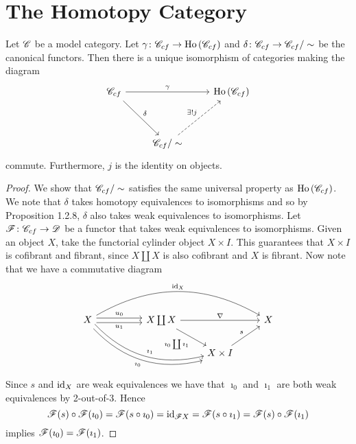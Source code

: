 \documentclass[10pt]{amsart}
\begin{document}
\section{The Homotopy Category}

\begin{cor}
  Let $\mathscr{C}$ be a model category.
  Let $\gamma \colon \mathscr{C}_{cf} \to \operatorname{Ho}\left(\mathscr{C}_{cf}\right)$ and $\delta \colon \mathscr{C}_{cf} \to \mathscr{C}_{cf}/\sim$ be the canonical functors.
  Then there is a unique isomorphism of categories making the diagram
  $$\begin{tikzcd}
    \C_{cf} \arrow{rdd}{\delta} \arrow{rr}{\gamma} & & \Ho{\C_{cf}}\\
      \\
      & \C_{cf}/\sim \arrow[dashed]{uur}{\exists ! j}
  \end{tikzcd}$$
  commute.
  Furthermore, $j$ is the identity on objects.

  \begin{proof}
    We show that $\mathscr{C}_{cf}/\sim$ satisfies the same universal property as $\operatorname{Ho}\left(\mathscr{C}_{cf}\right)$.
    We note that $\delta$ takes homotopy equivalences to isomorphisms and so by Proposition 1.2.8, $\delta$ also takes weak equivalences to isomorphisms.
    Let $\mathscr{F} \colon \mathscr{C}_{cf} \to \mathscr{D}$ be a functor that takes weak equivalences to isomorphisms.
    Given an object $X$, take the functorial cylinder object $X \times I$.
    This guarantees that $X \times I$ is cofibrant and fibrant, since $X \coprod X$ is also cofibrant and $X$ is fibrant.
    Now note that we have a commutative diagram
    $$\begin{tikzcd}
      X \arrow[shift left]{rr}{u_0} \arrow[shift right,swap]{rr}{u_1} \arrow[bend left]{rrrr}{\id_X} \arrow[bend right,shift left]{rrrd}{\imath_1}\arrow[bend right,shift right,swap]{rrrd}{\imath_0}
      && 
      X \coprod X \arrow{rr}{\nabla}\arrow[swap]{rd}{\imath_0 \coprod \imath_1} 
      && X\\
      && 
      & X \times I \arrow{ur}{s}
    \end{tikzcd}$$
    Since $s$ and $\operatorname{id}_X$ are weak equivalences we have that $\imath_0$ and $\imath_1$ are both weak equivalences by 2-out-of-3.
    Hence 
    $$\mathscr{F}(s) \circ \mathscr{F}(\imath_0) = \mathscr{F}(s \circ \imath_0) = \operatorname{id}_{\mathscr{F} X} = \mathscr{F}(s \circ \imath_1) = \mathscr{F}(s) \circ \mathscr{F}(\imath_1)$$
    implies $\mathscr{F}(\imath_0) = \mathscr{F}(\imath_1)$.
    

\end{proof}
\end{cor}
\end{document}
